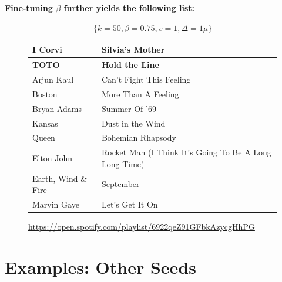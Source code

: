 \documentclass[a4paper, 12pt]{report}
\begin{document}
\paragraph{Fine-tuning \(\beta\) further yields the following list:}
\[\{k = 50, \beta = 0.75, v = 1, \Delta = 1\mu\}\]
\begin{center}
    \begin{figure}[H]
        \begin{tabulary}{\linewidth}{|@{\makebox[2em][c]{\rownumber}}|L|L|} 
            \hline
            I Corvi & Silvia's Mother \\ 
            \hline
            \textbf{TOTO} & \textbf{Hold the Line} \\
            \hline
            Arjun Kaul & Can't Fight This Feeling \\
            \hline
            Boston & More Than A Feeling \\
            \hline
            Bryan Adams & Summer Of '69 \\
            \hline
            Kansas & Dust in the Wind \\
            \hline
            Queen & Bohemian Rhapsody \\
            \hline
            Elton John & Rocket Man (I Think It's Going To Be A Long Long Time) \\
            \hline
            Earth, Wind \& Fire & September \\
            \hline
            Marvin Gaye & Let's Get It On \\
            \hline
        \end{tabulary}
    \caption{\url{https://open.spotify.com/playlist/6922qeZ91GFbkAzycgHhPG}}
    \end{figure}
\end{center}

\section{Examples: Other Seeds}
\end{document}
